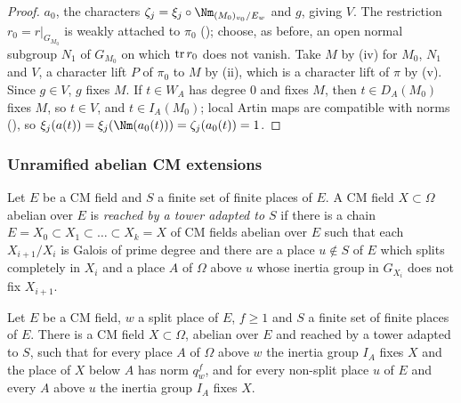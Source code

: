 \begin{proof}
$a_0$, the characters $\zeta_j=\xi_j\circ\Nm_{(M_0)_{v_0}/E_w}$ and $g$, giving $V$. The restriction $r_0=r|_{G_{M_0}}$ is
weakly attached to $\pi_0$ (); choose, as before, an open normal subgroup
$N_1$ of $G_{M_0}$ on which $\operatorname{tr} r_0$ does not vanish. Take $M$ by (iv) for $M_0$, $N_1$ and $V$, a character lift
$P$ of $\pi_0$ to $M$ by (ii), which is a character lift of $\pi$ by (v). Since $g\in V$, $g$ fixes $M$. If $t\in W_A$ has
degree $0$ and fixes $M$, then $t\in D_A(M_0)$ fixes $M$, so $t\in V$, and $t\in I_A(M_0)$; local Artin maps are
compatible with norms (), so
$\xi_j(a(t))=\xi_j(\Nm(a_0(t)))=\zeta_j(a_0(t))=1$.
\end{proof}

\subsubsection{Unramified abelian CM extensions}

\begin{definition}\label{pf:galred:tower}
Let $E$ be a CM field and $S$ a finite set of finite places of $E$. A CM field $X\subset\Omega$ abelian over $E$ is
\emph{reached by a tower adapted to $S$} if there is a chain $E=X_0\subset X_1\subset\dots\subset X_k=X$ of CM fields
abelian over $E$ such that each $X_{i+1}/X_i$ is Galois of prime degree and there are a place $u\notin S$ of $E$ which
splits completely in $X_i$ and a place $A$ of $\Omega$ above $u$ whose inertia group in $G_{X_i}$ does not fix $X_{i+1}$.
\end{definition}

\begin{theorem}\label{pf:galred:unrfield}
Let $E$ be a CM field, $w$ a split place of $E$, $f\ge1$ and $S$ a finite set of finite places of $E$. There is a CM field
$X\subset\Omega$, abelian over $E$ and reached by a tower adapted to $S$, such that for every place $A$ of $\Omega$ above
$w$ the inertia group $I_A$ fixes $X$ and the place of $X$ below $A$ has norm $q_w^f$, and for every non-split place $u$
of $E$ and every $A$ above $u$ the inertia group $I_A$ fixes $X$.
\end{theorem}

